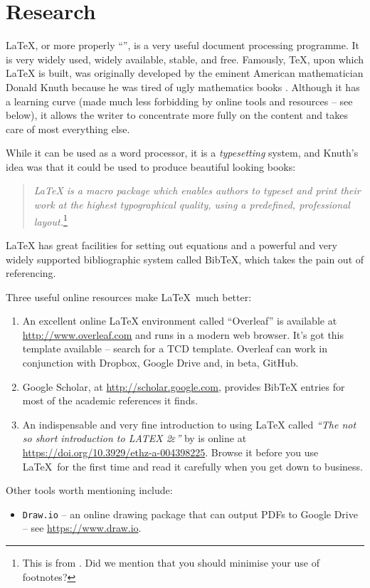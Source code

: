 \chapter{Research}


\label{latexchapter}
\LaTeX{}, or more properly ``\LaTeXe{}'', is a very useful document processing programme. It is very widely used, widely available, stable, and free. Famously, \TeX, upon which \LaTeX{} is built, was originally developed by the eminent American mathematician Donald Knuth because he was tired of ugly mathematics books \cite{shustek2008interview}. Although it has a learning curve (made much less forbidding by online tools and resources -- see below), it allows the writer to concentrate more fully on the content and takes care of most everything else.

While it can be used as a word processor, it is a \emph{typesetting} system, and Knuth's idea was that it could be used to produce beautiful looking books:
\begin{quote}
\emph{\LaTeX{} is a macro package which enables authors to typeset and print their work at the highest typographical quality, using a predefined, professional layout.}\footnote{This is from \cite{oetiker2001not}. Did we mention that you should minimise your use of footnotes?}
\end{quote}
\LaTeX{} has great facilities for setting out equations and a powerful and very widely supported bibliographic system called BibTeX, which takes the pain out of referencing.

Three useful online resources make \LaTeX~much better:
\begin{enumerate}[(1)]
\item An excellent online \LaTeX{} environment called ``Overleaf'' is available at \url{http://www.overleaf.com} and runs in a modern web browser. It's got this template available -- search for a TCD template. Overleaf can work in conjunction with Dropbox, Google Drive and, in beta, GitHub.
\item Google Scholar, at \url{http://scholar.google.com}, provides BibTeX entries for most of the academic references it finds.
\item An indispensable and very fine introduction to using \LaTeX{} called \emph{``The not so short introduction to LATEX 2$\varepsilon$''} by \cite{oetiker2001not} is online at \url{https://doi.org/10.3929/ethz-a-004398225}. Browse it before you use \LaTeX~for the first time and  read it carefully when you get down to business.
\end{enumerate}
Other tools worth mentioning include:
\begin{itemize}
\item \texttt{Draw.io} -- an online drawing package that can output PDFs to Google Drive -- see \url{https://www.draw.io}.
\end{itemize}